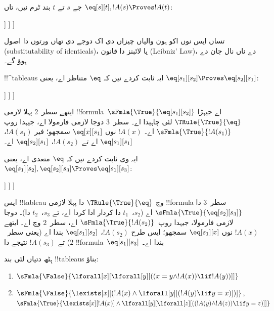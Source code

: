 \documentclass[../../../include/open-logic-section]{subfiles}
\begin{document}
\begin{ex}
جے $s$ تے $t$ بند ٹرم نیں، تاں $\eq[s][t], !A(s)
\Proves !A(t)$:
\begin{oltableau}
  [\sFmla{\False}{\formula{A}(t)}, just = \TAss
    [\sFmla{\True}{\eq[s][t]}, just = \TAss
      [\sFmla{\True}{\formula{A}(s)}, just = \TAss
        [\sFmla{\True}{\formula{A}(t)}, just={\TRule{\True}{\eq}[2, 3]}, close]
      ]
    ]
  ]
\end{oltableau}
تساں ایس نوں اکو ہون والیاں چیزاں دی اک دوجے دی تھاں ورتوں دا اصول
(substitutability of identicals)، یا لائبنز دا قانون (Leibniz' Law)،
دے ناں نال جان دے ہوؤ گے۔

!!^{tableau}s ایہ ثابت کردے نیں کہ $\eq$ متناظر اے، یعنی
$\eq[s_1][s_2]
\Proves \eq[s_2][s_1]$:
\begin{oltableau}
  [\sFmla{\False}{\eq[s_2][s_1]}, just = \TAss
    [\sFmla{\True}{\eq[s_1][s_2]}, just = \TAss
      [\sFmla{\True}{\eq[s_1][s_1]}, just = {$\eq$}
        [\sFmla{\True}{\eq[s_2][s_1]}, just = {\TRule{\True}{\eq}[2, 3]}, close]
      ]
    ]
  ]
\end{oltableau}
ایتھے سطر~$2$ پہلا لازمی !!{formula}~$\sFmla{\True}{\eq[s_1][s_2]}$
اے جیہڑا $\TRule{\True}{\eq}$ لئی چاہیدا اے۔ سطر~$3$ دوجا
لازمی فارمولا اے، جیہدا روپ $\sFmla{\True}{!A(s_1)}$ اے۔
$!A(x)$ نوں $\eq[x][s_1]$ سمجھو؛ فیر $!A(s_1)$،
$\eq[s_1][s_1]$ اے تے $!A(s_2)$، $\eq[s_2][s_1]$ اے۔

ایہ وی ثابت کردے نیں کہ $\eq$ متعدی اے، یعنی
$\eq[s_1][s_2],
\eq[s_2][s_3] \Proves \eq[s_1][s_3]$:
\begin{oltableau}
  [\sFmla{\False}{\eq[s_1][s_3]}, just = \TAss
    [\sFmla{\True}{\eq[s_1][s_2]}, just = \TAss
      [\sFmla{\True}{\eq[s_2][s_3]}, just = \TAss
        [\sFmla{\True}{\eq[s_1][s_3]}, just = {\TRule{\True}{\eq}[3, 2]}, close]
      ]
    ]
  ]
\end{oltableau}
ایس !!{tableau} وچ $\TRule{\True}{\eq}$ دا پہلا لازمی
!!{formula} سطر~$3$ دا $\sFmla{\True}{\eq[s_2][s_3]}$ اے
($s_2$،~$t_1$ دا کردار ادا کردا اے، تے $s_3$،~$t_2$ دا)۔
دوجا لازمی فارمولا، جیہدا روپ~$\sFmla{\True}{!A(s_2)}$ اے،
سطر~$2$ وچ اے۔ ایتھے $!A(x)$ نوں $\eq[s_1][x]$ سمجھو؛
ایس طرح $!A(s_2)$، $\eq[s_1][s_2]$ بندا اے (یعنی سطر~$2$)
تے $!A(s_3)$ نتیجے دا !!{formula}~$\eq[s_1][s_3]$ بندا اے۔
\end{ex}

\begin{prob}
ہِٹھ دتیاں لئی بند !!{tableau}s بناؤ:
\begin{enumerate}
\item $\sFmla{\False}{\lforall[x][\lforall[y][((x = y \land !A(x))
      \lif !A(y))]]}$
\item $\sFmla{\False}{\lexists[x][(!A(x) \land
    \lforall[y][(!A(y) \lif y = x)])]}$,\\
  $\sFmla{\True}{\lexists[x][!A(x)] \land
    \lforall[y][\lforall[z][((!A(y) \land !A(z)) \lif y = z)]]}$
\end{enumerate}
\end{prob}
\end{document}
